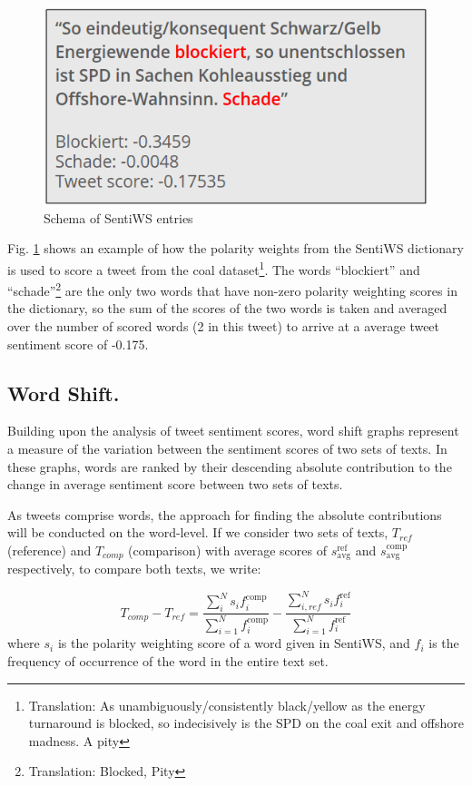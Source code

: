 \documentclass[12pt,onecolumn,twoside]{layout}
\begin{document}
\begin{figure}
	\begin{center}
		\includegraphics[width=0.5\linewidth]{figures/sentiws_example_use}
	\end{center}
	\caption{Schema of SentiWS entries}
	\label{fig:sentiws_example_use}
\end{figure}

Fig. \ref{fig:sentiws_example_use} shows an example of how the polarity weights from the SentiWS dictionary is used to score a tweet from the coal dataset\footnote{Translation: As unambiguously/consistently black/yellow as the energy turnaround is blocked, so indecisively is the SPD on the coal exit and offshore madness. A pity}. The words ``blockiert'' and ``schade''\footnote{Translation: Blocked, Pity} are the only two words that have non-zero polarity weighting scores in the dictionary, so the sum of the scores of the two words is taken and averaged over the number of scored words (2 in this tweet) to arrive at a average tweet sentiment score of -0.175.

\subsection*{Word Shift.}
Building upon the analysis of tweet sentiment scores, word shift graphs represent a measure of the variation between the sentiment scores of two sets of texts. In these graphs, words are ranked by their descending absolute contribution to the change in average sentiment score between two sets of texts.

As tweets comprise words, the approach for finding the absolute contributions will be conducted on the word-level. If we consider two sets of texts, \(T_{ref}\) (reference) and \(T_{comp}\) (comparison) with average scores of \(s_{\text{avg}}^{\text{ref}}\) and \(s_{\text{avg}}^{\text{comp}}\) respectively, to compare both texts, we write:

\begin{equation}
\label{eq:text_difference}
T_{comp} - T_{ref} = \frac{\sum_{i}^{N} s_i f_i^{\text{comp}}}{\sum_{i=1}^{N} f_i^{\text{comp}}} - \frac{\sum_{i,ref}^{N} s_i f_i^{\text{ref}}}{\sum_{i=1}^{N} f_i^{\text{ref}}}
\end{equation}
where \(s_i\) is the polarity weighting score of a word given in SentiWS, and \(f_i\) is the frequency of occurrence of the word in the entire text set.
\end{document}
